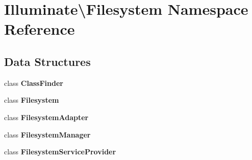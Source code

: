 \section{Illuminate\textbackslash{}Filesystem Namespace Reference}
\label{namespace_illuminate_1_1_filesystem}
\subsection*{Data Structures}
\begin{DoxyCompactItemize}
\item 
class {\bf Class\+Finder}
\item 
class {\bf Filesystem}
\item 
class {\bf Filesystem\+Adapter}
\item 
class {\bf Filesystem\+Manager}
\item 
class {\bf Filesystem\+Service\+Provider}
\end{DoxyCompactItemize}
